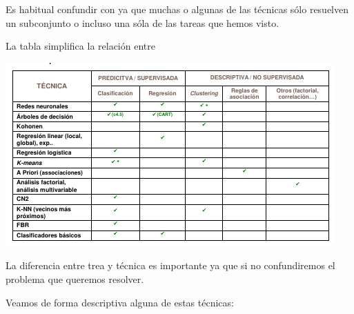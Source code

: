 Es habitual confundir  con  ya que muchas o algunas de las técnicas sólo resuelven un subconjunto o incluso una sóla de las tareas que hemos visto.

La tabla simplifica la relación entre 

\begin{center}
    \includegraphics[scale=.6]{images/mod01-19.png}
\end{center}

La diferencia entre trea y técnica es importante ya que si no confundiremos el problema que queremos resolver.

Veamos de forma descriptiva alguna de estas técnicas:

